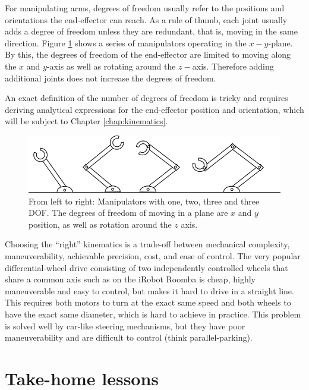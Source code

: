 For manipulating arms, degrees of freedom usually refer to the positions and orientations the end-effector can reach. As a rule of thumb, each joint usually adds a degree of freedom unless they are redundant, that is, moving in the same direction. Figure \ref{fig:basickinematics} shows a series of manipulators operating in the $x-y$-plane. By this, the degrees of freedom of the end-effector are limited to moving along the $x$ and $y$-axis as well as rotating around the $z-$axis. Therefore adding additional joints does not increase the degrees of freedom. 

An exact definition of the number of degrees of freedom is tricky and requires deriving analytical expressions for the end-effector position and orientation, which will be subject to Chapter \ref{chap:kinematics}.

\begin{figure}
	\centering
		\includegraphics[width=\textwidth]{figs/basickinematics.png}
	\caption{From left to right: Manipulators with one, two, three and three DOF. The degrees of freedom of moving in a plane are $x$ and $y$ position, as well as rotation around the $z$ axis.}
	\label{fig:basickinematics}
\end{figure}

Choosing the ``right'' kinematics is a trade-off between mechanical complexity, maneuverability, achievable precision, cost, and ease of control. The very popular differential-wheel drive consisting of two independently controlled wheels that share a common axis such as on the iRobot Roomba is cheap, highly maneuverable and easy to control, but makes it hard to drive in a straight line. This requires both motors to turn at the exact same speed and both wheels to have the exact same diameter, which is hard to achieve in practice. This problem is solved well by car-like steering mechanisms, but they have poor maneuverability and are difficult to control (think parallel-parking).



\section*{Take-home lessons}

